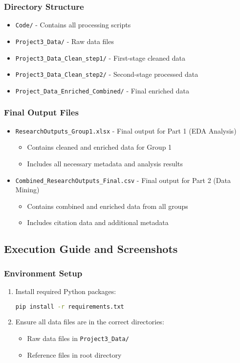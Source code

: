 \documentclass[12pt]{article}
\begin{document}
\subsubsection{Directory Structure}
\begin{itemize}
    \item \texttt{Code/} - Contains all processing scripts
    \item \texttt{Project3\_Data/} - Raw data files
    \item \texttt{Project3\_Data\_Clean\_step1/} - First-stage cleaned data
    \item \texttt{Project3\_Data\_Clean\_step2/} - Second-stage processed data
    \item \texttt{Project\_Data\_Enriched\_Combined/} - Final enriched data
\end{itemize}

\subsubsection{Final Output Files}
\begin{itemize}
    \item \texttt{ResearchOutputs\_Group1.xlsx} - Final output for Part 1 (EDA Analysis)
    \begin{itemize}
        \item Contains cleaned and enriched data for Group 1
        \item Includes all necessary metadata and analysis results
    \end{itemize}
    \item \texttt{Combined\_ResearchOutputs\_Final.csv} - Final output for Part 2 (Data Mining)
    \begin{itemize}
        \item Contains combined and enriched data from all groups
        \item Includes citation data and additional metadata
    \end{itemize}
\end{itemize}

\subsection{Execution Guide and Screenshots}
\subsubsection{Environment Setup}
\begin{enumerate}
    \item Install required Python packages:
    \begin{lstlisting}[language=bash]
    pip install -r requirements.txt
    \end{lstlisting}
    \item Ensure all data files are in the correct directories:
    \begin{itemize}
        \item Raw data files in \texttt{Project3\_Data/}
        \item Reference files in root directory
    \end{itemize}
\end{enumerate}
\end{document}
